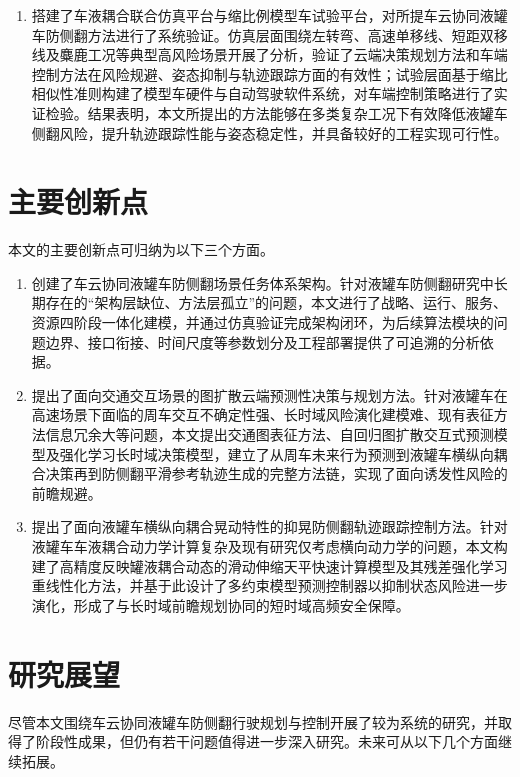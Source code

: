 \begin{enumerate}[itemsep=2pt, parsep=0pt]
    \item 搭建了车液耦合联合仿真平台与缩比例模型车试验平台，对所提车云协同液罐车防侧翻方法进行了系统验证。仿真层面围绕左转弯、高速单移线、短距双移线及麋鹿工况等典型高风险场景开展了分析，验证了云端决策规划方法和车端控制方法在风险规避、姿态抑制与轨迹跟踪方面的有效性；试验层面基于缩比相似性准则构建了模型车硬件与自动驾驶软件系统，对车端控制策略进行了实证检验。结果表明，本文所提出的方法能够在多类复杂工况下有效降低液罐车侧翻风险，提升轨迹跟踪性能与姿态稳定性，并具备较好的工程实现可行性。
\end{enumerate}

\section{主要创新点}

本文的主要创新点可归纳为以下三个方面。

\begin{enumerate}[itemsep=2pt, parsep=0pt]
    \item 创建了车云协同液罐车防侧翻场景任务体系架构。针对液罐车防侧翻研究中长期存在的“架构层缺位、方法层孤立”的问题，本文进行了战略、运行、服务、资源四阶段一体化建模，并通过仿真验证完成架构闭环，为后续算法模块的问题边界、接口衔接、时间尺度等参数划分及工程部署提供了可追溯的分析依据。
    
    \item 提出了面向交通交互场景的图扩散云端预测性决策与规划方法。针对液罐车在高速场景下面临的周车交互不确定性强、长时域风险演化建模难、现有表征方法信息冗余大等问题，本文提出交通图表征方法、自回归图扩散交互式预测模型及强化学习长时域决策模型，建立了从周车未来行为预测到液罐车横纵向耦合决策再到防侧翻平滑参考轨迹生成的完整方法链，实现了面向诱发性风险的前瞻规避。
    
    \item 提出了面向液罐车横纵向耦合晃动特性的抑晃防侧翻轨迹跟踪控制方法。针对液罐车车液耦合动力学计算复杂及现有研究仅考虑横向动力学的问题，本文构建了高精度反映罐液耦合动态的滑动伸缩天平快速计算模型及其残差强化学习重线性化方法，并基于此设计了多约束模型预测控制器以抑制状态风险进一步演化，形成了与长时域前瞻规划协同的短时域高频安全保障。
\end{enumerate}

\section{研究展望}

尽管本文围绕车云协同液罐车防侧翻行驶规划与控制开展了较为系统的研究，并取得了阶段性成果，但仍有若干问题值得进一步深入研究。未来可从以下几个方面继续拓展。


